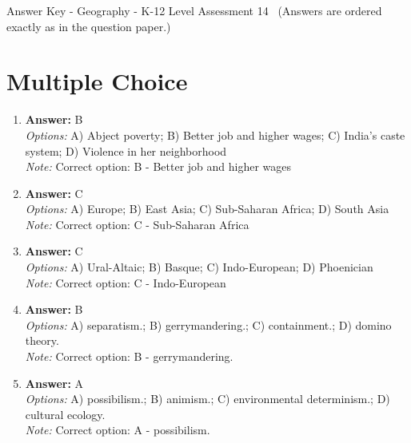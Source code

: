 \documentclass[12pt]{article}
\begin{document}
\begin{center}
Answer Key - Geography - K-12 Level Assessment 14 \
\small (Answers are ordered exactly as in the question paper.)
\end{center}

\section*{Multiple Choice}
\begin{enumerate}[label=\arabic*.]
\item \textbf{Answer:} B
\\ \textit{Options:} A) Abject poverty; B) Better job and higher wages; C) India's caste system; D) Violence in her neighborhood
\\ \textit{Note:} Correct option: B - Better job and higher wages
\item \textbf{Answer:} C
\\ \textit{Options:} A) Europe; B) East Asia; C) Sub-Saharan Africa; D) South Asia
\\ \textit{Note:} Correct option: C - Sub-Saharan Africa
\item \textbf{Answer:} C
\\ \textit{Options:} A) Ural-Altaic; B) Basque; C) Indo-European; D) Phoenician
\\ \textit{Note:} Correct option: C - Indo-European
\item \textbf{Answer:} B
\\ \textit{Options:} A) separatism.; B) gerrymandering.; C) containment.; D) domino theory.
\\ \textit{Note:} Correct option: B - gerrymandering.
\item \textbf{Answer:} A
\\ \textit{Options:} A) possibilism.; B) animism.; C) environmental determinism.; D) cultural ecology.
\\ \textit{Note:} Correct option: A - possibilism.
\end{enumerate}
\end{document}
